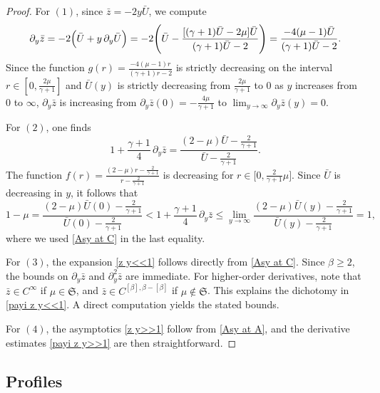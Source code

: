 \documentclass{article}
\newcommand{\ga}{\gamma}
\newcommand{\pa}{\partial}
\def\ssmu{\mathfrak S}
\numberwithin{equation}{section}
\begin{document}
\begin{proof}
For $(1)$, since $\bar z = -2y\bar U$, we compute
\[
    \partial_y \bar z = -2\Bigl(\bar U + y\,\partial_y \bar U \Bigr)
    = -2\Biggl(\bar U - \frac{[(\gamma+1)\bar U - 2\mu]\bar U}{(\gamma+1)\bar U-2}\Biggr)
    = \frac{-4(\mu-1)\bar U}{(\gamma+1)\bar U - 2}.
\]
Since the function $g(r) = \frac{-4(\mu-1)r}{(\gamma+1)r - 2}$ is strictly decreasing on the interval $r\in[0, \frac{2\mu}{\ga+1}]$ and $\bar U(y)$ is strictly decreasing from $\frac{2\mu}{\ga+1}$ to $0$ as $y$ increases from $0$ to $\infty$, $ \partial_y \bar z$ is increasing from $\partial_y \bar z(0)=-\frac{4\mu}{\ga+1}$ to $\lim_{y\to \infty} \pa_y \bar z(y)=0$.

For $(2)$, one finds
\[
    1+\frac{\gamma+1}{4}\,\partial_y \bar z
    = \frac{(2-\mu)\bar U - \tfrac{2}{\gamma+1}}{\bar U - \tfrac{2}{\gamma+1}}.
\]
The function $f(r)=\frac{(2-\mu)r-\tfrac{2}{\gamma+1}}{r-\tfrac{2}{\gamma+1}}$ is decreasing for $r\in\bigl[0,\tfrac{2}{\gamma+1}\mu\bigr]$. Since $\bar U$ is decreasing in $y$, it follows that
\[
    1-\mu = \frac{(2-\mu)\bar U(0) - \tfrac{2}{\gamma+1}}{\bar U(0)-\tfrac{2}{\gamma+1}}
    < 1+\frac{\gamma+1}{4}\,\partial_y \bar z
    \leq \lim_{y\to\infty} \frac{(2-\mu)\bar U(y) - \tfrac{2}{\gamma+1}}{\bar U(y)-\tfrac{2}{\gamma+1}} = 1,
\]
where we used \eqref{Asy at C} in the last equality.

For $(3)$, the expansion \eqref{z y<<1} follows directly from \eqref{Asy at C}. Since $\beta \geq 2$, the bounds on $\partial_y \bar z$ and $\partial_y^2 \bar z$ are immediate. For higher-order derivatives, note that $\bar z \in C^{\infty}$ if $\mu \in \ssmu$, and $\bar z \in C^{[\beta],\beta-[\beta]}$ if $\mu \notin \ssmu$. This explains the dichotomy in \eqref{payi z y<<1}. A direct computation yields the stated bounds.

For $(4)$, the asymptotics \eqref{z y>>1} follow from \eqref{Asy at A}, and the derivative estimates \eqref{payi z y>>1} are then straightforward.
\end{proof}



\subsection{Profiles}
\end{document}
